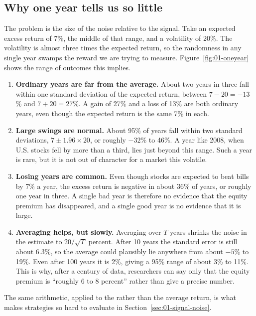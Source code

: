 \subsection{Why one year tells us so little}

The problem is the size of the noise relative to the signal. Take an expected excess return of 7\%, the middle of that range, and a volatility of 20\%. The volatility is almost three times the expected return, so the randomness in any single year swamps the reward we are trying to measure. Figure~\ref{fig:01-oneyear} shows the range of outcomes this implies.

\begin{enumerate}
  \item \textbf{Ordinary years are far from the average.} About two years in three fall within one standard deviation of the expected return, between $7 - 20 = -13$\% and $7 + 20 = 27$\%. A gain of 27\% and a loss of 13\% are both ordinary years, even though the expected return is the same 7\% in each.
  \item \textbf{Large swings are normal.} About 95\% of years fall within two standard deviations, $7 \pm 1.96 \times 20$, or roughly $-32$\% to 46\%. A year like 2008, when U.S. stocks fell by more than a third, lies just beyond this range. Such a year is rare, but it is not out of character for a market this volatile.
  \item \textbf{Losing years are common.} Even though stocks are expected to beat bills by 7\% a year, 
  the excess return is negative in about 36\% of years, or roughly one year in three. A single bad year is therefore no evidence that the equity premium has disappeared, and a single good year is no evidence that it is large.
  \item \textbf{Averaging helps, but slowly.} Averaging over $T$ years shrinks the noise in the estimate to $20/\sqrt{T}$ percent. After 10 years the standard error is still about 6.3\%, so the average could plausibly lie anywhere from about $-5$\% to 19\%. Even after 100 years it is 2\%, giving a 95\% range of about 3\% to 11\%. This is why, after a century of data, researchers can say only that the equity premium is ``roughly 6 to 8 percent'' rather than give a precise number.
\end{enumerate}

The same arithmetic, applied to the  rather than the average return, is what makes strategies so hard to evaluate in Section~\ref{sec:01-signal-noise}.

